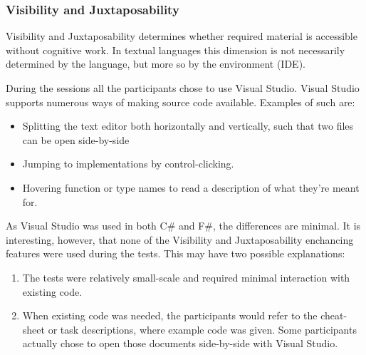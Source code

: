 \subsubsection{Visibility and Juxtaposability}
Visibility and Juxtaposability determines whether required material is accessible without cognitive work\cite{green1996usability}. In textual languages this dimension is not necessarily determined by the language, but more so by the environment (\gls{IDE}).

During the sessions all the participants chose to use Visual Studio. Visual Studio supports numerous ways of making source code available. Examples of such are:
\begin{itemize}
    \item Splitting the text editor both horizontally and vertically, such that two files can be open side-by-side
    \item Jumping to implementations by control-clicking. 
    \item Hovering function or type names to read a description of what they're meant for. 
\end{itemize}
As Visual Studio was used in both C\# and F\#, the differences are minimal. It is interesting, however, that none of the Visibility and Juxtaposability enchancing features were used during the tests. This may have two possible explanations:
\begin{enumerate}
    \item The tests were relatively small-scale and required minimal interaction with existing code.
    \item When existing code was needed, the participants would refer to the cheat-sheet or task descriptions, where example code was given. Some participants actually chose to open those documents side-by-side with Visual Studio.
\end{enumerate}